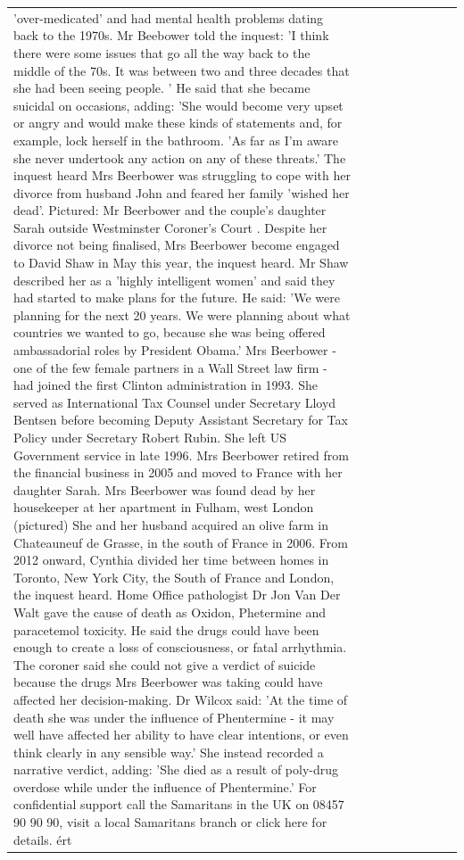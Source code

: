 \begin{table}[H]
\begin{tabular}{lllrlllll}
'over-medicated' and had mental health problems dating back to the 1970s. Mr Beebower told the inquest: 'I think there were some issues that go all the way back to the middle of the 70s. It was between two and three decades that she had been seeing people. ' He said that she became suicidal on occasions, adding: 'She would become very upset or angry and would make these kinds of statements and, for example, lock herself in the bathroom. 'As far as I'm aware she never undertook any action on any of these threats.' The inquest heard Mrs Beerbower was struggling to cope with her divorce from husband John and feared her family 'wished her dead'. Pictured: Mr Beerbower and the couple's daughter Sarah outside Westminster Coroner's Court . Despite her divorce not being finalised, Mrs Beerbower become engaged to David Shaw in May this year, the inquest heard. Mr Shaw described her as a 'highly intelligent women' and said they had started to make plans for the future. He said: 'We were planning for the next 20 years. We were planning about what countries we wanted to go, because she was being offered ambassadorial roles by President Obama.' Mrs Beerbower - one of the few female partners in a Wall Street law firm - had joined the first Clinton administration in 1993. She served as International Tax Counsel under Secretary Lloyd Bentsen before becoming Deputy Assistant Secretary for Tax Policy under Secretary Robert Rubin. She left US Government service in late 1996. Mrs Beerbower retired from the financial business in 2005 and moved to France with her daughter Sarah. Mrs Beerbower was found dead by her housekeeper at her apartment in Fulham, west London (pictured) She and her husband acquired an olive farm in Chateauneuf de Grasse, in the south of France in 2006. From 2012 onward, Cynthia divided her time between homes in Toronto, New York City, the South of France and London, the inquest heard. Home Office pathologist Dr Jon Van Der Walt gave the cause of death as Oxidon, Phetermine and paracetemol toxicity. He said the drugs could have been enough to create a loss of consciousness, or fatal arrhythmia. The coroner said she could not give a verdict of suicide because the drugs Mrs Beerbower was taking could have affected her decision-making. Dr Wilcox said: 'At the time of death she was under the influence of Phentermine - it may well have affected her ability to have clear intentions, or even think clearly in any sensible way.' She instead recorded a narrative verdict, adding: 'She died as a result of poly-drug overdose while under the influence of Phentermine.' For confidential support call the Samaritans in the UK on 08457 90 90 90, visit a local Samaritans branch or click here for details. ért \\

\end{tabular}
\end{table}
